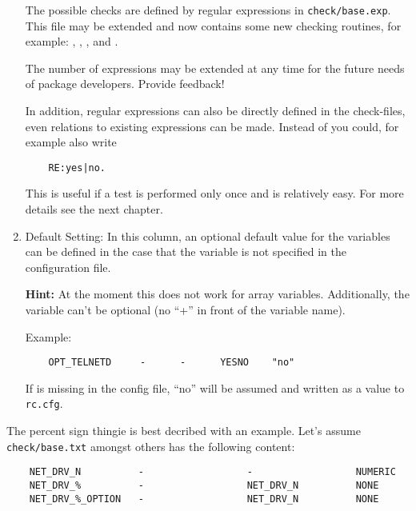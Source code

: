 \begin{enumerate}
  The possible checks are defined by regular expressions in \texttt{check/base.exp}.
  This file may be extended and now contains some new checking routines, for example:
  , , ,  and .

  The number of expressions may be extended at any time for the future needs of
  package developers. Provide feedback!

  In addition, regular expressions can also be directly defined in the check-files,
  even relations to existing expressions can be made. Instead of  you
  could, for example also write
\begin{example}
\begin{verbatim}
    RE:yes|no.
\end{verbatim}
\end{example}
This is useful if a test is performed only once and is relatively easy. For
more details see the next chapter.

\item Default Setting: In this column, an optional default value for the variables
can be defined in the case that the variable is not specified in the configuration file.

\textbf{Hint:} At the moment this does not work for array variables. Additionally,
the variable can't be optional (no ``+'' in front of the variable name).

Example:
\begin{example}
\begin{verbatim}
    OPT_TELNETD     -      -      YESNO    "no"
\end{verbatim}
\end{example}

If  is missing in the config file, ``no'' will be assumed
and written as a value to \texttt{rc.cfg}.

\end{enumerate}

    The percent sign thingie is best decribed with an example. Let's assume
    \texttt{check/base.txt} amongst others has the following content:
\begin{example}
\begin{verbatim}
    NET_DRV_N          -                  -                  NUMERIC
    NET_DRV_%          -                  NET_DRV_N          NONE
    NET_DRV_%_OPTION   -                  NET_DRV_N          NONE
\end{verbatim}
\end{example}

